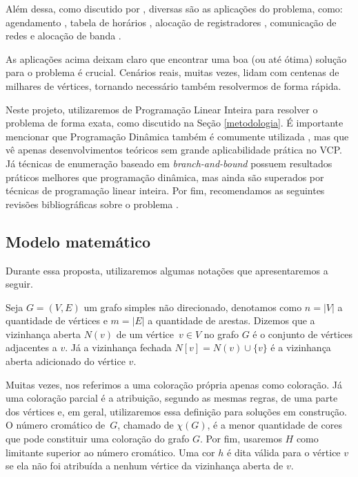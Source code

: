 \documentclass[11pt]{article}
\begin{document}
Além dessa, como discutido por \textcite{Malaguti2010surveyvertexcoloring}, diversas são as aplicações do problema, como: agendamento \autocite{Leighton1979GraphColoringAlgorithm}, tabela de horários \autocite{Werra1985introductiontimetabling}, alocação de registradores \autocite{Chow1990prioritybasedcoloring}, comunicação de redes \autocite{Caprara2007PassengerRailwayOptimization} e alocação de banda \autocite{Gamst1986Somelowerbounds}.

As aplicações acima deixam claro que encontrar uma boa (ou até ótima) solução para o problema é crucial.
Cenários reais, muitas vezes, lidam com centenas de milhares de vértices, tornando necessário também resolvermos de forma rápida.

Neste projeto, utilizaremos de Programação Linear Inteira para resolver o problema de forma exata, como discutido na Seção \ref{metodologia}.
É importante mencionar que Programação Dinâmica também é comumente utilizada \autocites{Eppstein2006SmallMaximalIndependent}[][]{Byskov2002ChromaticNumberTime}, mas que vê apenas desenvolvimentos teóricos sem grande aplicabilidade prática no VCP.
Já técnicas de enumeração baseado em \emph{branch-and-bound} \autocite{Brelaz1979Newmethodscolor} possuem resultados práticos melhores que programação dinâmica, mas ainda são superados por técnicas de programação linear inteira.
Por fim, recomendamos as seguintes revisões bibliográficas sobre o problema  \autocites{Malaguti2010surveyvertexcoloring}[][]{Lewis2015GuideGraphColouring}[][]{Husfeldt2015Graphcolouringalgorithms}[][]{Lima2018ExactAlgorithmsGraph}.

\subsection{Modelo matemático}
\label{sec:orgf91c53e}
Durante essa proposta, utilizaremos algumas notações que apresentaremos a seguir.

Seja \(G = (V,E)\) um grafo simples não direcionado, denotamos como \(n = |V|\) a quantidade de vértices e \(m = |E|\) a quantidade de arestas.
Dizemos que a vizinhança aberta \(N(v)\) de um vértice~\(v \in V\) no grafo \(G\) é o conjunto de vértices adjacentes a \(v\).
Já a vizinhança fechada \(N[v] = N(v) \cup \{v\}\) é a vizinhança aberta adicionado do vértice \(v\).

Muitas vezes, nos referimos a uma coloração própria apenas como coloração.
Já uma coloração parcial é a atribuição, segundo as mesmas regras, de uma parte dos vértices e, em geral, utilizaremos essa definição para soluções em construção.
O número cromático de~\(G\), chamado de \(\chi(G)\), é a menor quantidade de cores que pode constituir uma coloração do grafo \(G\).
Por fim, usaremos \(H\) como limitante superior ao número cromático.
Uma cor \(h\) é dita válida para o vértice \(v\) se ela não foi atribuída a nenhum vértice da vizinhança aberta de \(v\).
\end{document}
